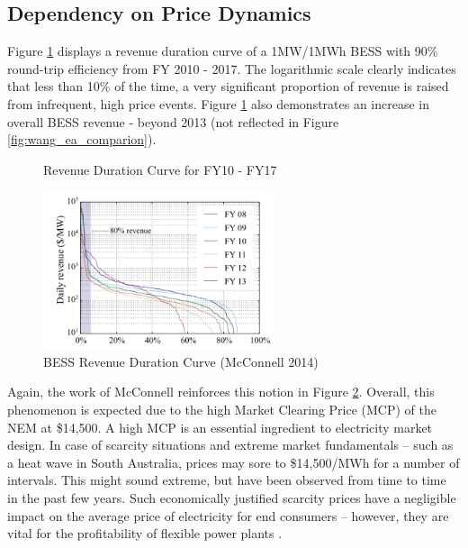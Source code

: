 \subsection{ Dependency on Price Dynamics }
Figure \ref{fig:revenue_duration} displays a revenue duration curve of a 1MW/1MWh BESS with 90\% round-trip efficiency from FY 2010 - 2017. The logarithmic scale clearly indicates that less than 10\% of the time, a very significant proportion of revenue is raised from infrequent, high price events. Figure \ref{fig:revenue_duration} also demonstrates an increase in overall BESS revenue - beyond 2013 (not reflected in Figure \ref{fig:wang_ea_comparion}). 
\begin{figure}[H]
    \centering
    \caption{Revenue Duration Curve for FY10 - FY17}
    \label{fig:revenue_duration}
\end{figure}
\begin{figure}
    \begin{center}
        \includegraphics[width=0.6\textwidth]{Pictures/Chapter3/mcconnell_revenue_duration.png}
    \end{center}
    \caption{BESS Revenue Duration Curve (McConnell 2014)}
    \label{fig:mcconnell_rev_duration}
\end{figure}
 Again, the work of McConnell reinforces this notion in Figure  \ref{fig:mcconnell_rev_duration}. Overall, this phenomenon is expected due to the high Market Clearing Price (MCP) of the NEM at \$14,500.  A high MCP is an essential ingredient to electricity market design. In case of scarcity situations and extreme market fundamentals – such as a heat wave in South Australia, prices may sore to \$14,500/MWh for a number of intervals. This might sound extreme, but have been observed from time to time in the past few years. Such economically justified scarcity prices have a negligible impact on the average price of
electricity for end consumers – however, they are vital for the profitability of flexible power plants \parencite{scarcity_pricing}. 
